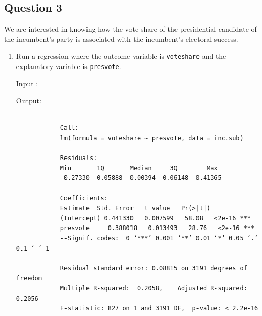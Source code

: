 \documentclass[12pt,letterpaper]{article}
\begin{document}
\begin{enumerate}
	\newpage	
\section*{Question 3}

\noindent We are interested in knowing how the vote share of the presidential candidate of the incumbent's party is associated with the incumbent's electoral success.
	\vspace{.25cm}
	\begin{enumerate}
		\item Run a regression where the outcome variable is \texttt{voteshare} and the explanatory variable is \texttt{presvote}.
		
					\noindent Input :
		  
		
		
		Output:
		\begin{verbatim}
			
			Call:
			lm(formula = voteshare ~ presvote, data = inc.sub)
			
			Residuals:    
			Min       1Q       Median     3Q        Max 
			-0.27330 -0.05888  0.00394  0.06148  0.41365
			
			Coefficients:            
			Estimate  Std. Error   t value   Pr(>|t|)    
			(Intercept) 0.441330   0.007599   58.08   <2e-16 ***
			presvote     0.388018   0.013493   28.76   <2e-16 ***
			--Signif. codes:  0 ‘***’ 0.001 ‘**’ 0.01 ‘*’ 0.05 ‘.’ 0.1 ‘ ’ 1
			
			Residual standard error: 0.08815 on 3191 degrees of freedom
			Multiple R-squared:  0.2058,	Adjusted R-squared:  0.2056 
			F-statistic: 827 on 1 and 3191 DF,  p-value: < 2.2e-16
			
		\end{verbatim}
		\normalsize
		

\end{enumerate}
\end{enumerate}
\end{document}
